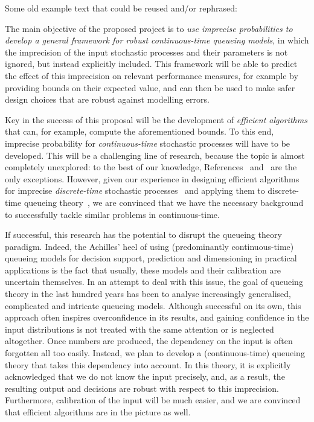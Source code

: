 \documentclass[11pt,dvipsnames,usenames,a4paper]{article}
\begin{document}
{\color{Gray}
Some old example text that could be reused and/or rephrased:

The main objective of the proposed project is to \emph{use imprecise probabilities to develop a general framework for robust continuous-time queueing models}, in which the  imprecision of the input stochastic processes and their parameters is not ignored, but instead explicitly included. This framework will be able to predict the effect of this imprecision on relevant performance measures, for example by providing bounds on their expected value, and can then be used to make safer design choices that are robust against modelling errors.


Key in the success of this proposal will be the development of \emph{efficient algorithms} that can, for example, compute the aforementioned bounds. To this end, imprecise probability for \emph{continuous-time} stochastic processes will have to be developed. This will be a challenging line of research, because the topic is almost completely unexplored: to the best of our knowledge, References~\cite{Troffaes+GSB-ISIPTA15p} and~\cite{Skulj2015} are the only exceptions. However, given our experience in designing efficient algorithms for imprecise \emph{discrete-time} stochastic processes~\cite{cooman2008} and applying them to discrete-time queueing theory~\cite{2015Lopatatzidis}, we are convinced that we have the necessary background to successfully tackle similar problems in continuous-time.

If successful, this research has the potential to disrupt the queueing theory paradigm.
Indeed, the Achilles' heel of using (predominantly continuous-time) queueing models for decision support, prediction and dimensioning in practical applications is the fact that usually, these models and their calibration are uncertain themselves.
In an attempt to deal with this issue, the goal of queueing theory in the last hundred years has been to analyse increasingly generalised, complicated and intricate queueing models.
Although successful on its own, this approach often inspires overconfidence in its results, and gaining confidence in the input distributions is not treated with the same attention or is neglected altogether.
Once numbers are produced, the dependency on the input is often forgotten all too easily.
Instead, we plan to develop a (continuous-time) queueing theory that takes this dependency into account. In this theory, it is explicitly acknowledged that we do not know the input precisely, and, as a result, the resulting output and decisions are robust with respect to this imprecision. Furthermore, calibration of the input will be much easier, and we are convinced that efficient algorithms are in the picture as well.

}
\end{document}
